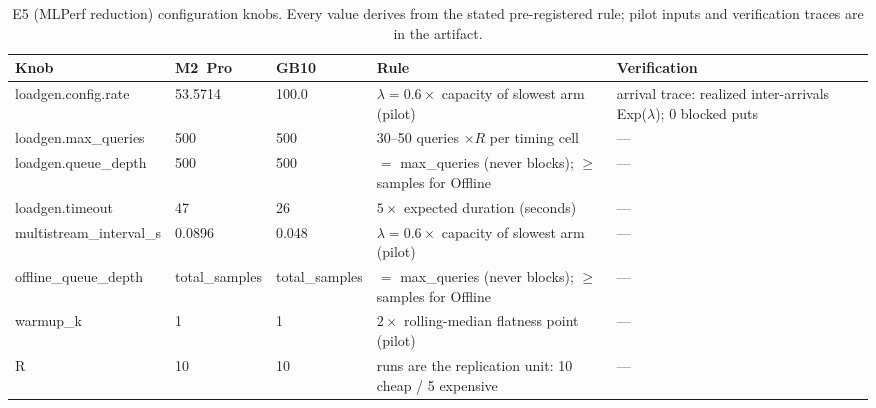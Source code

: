 \begin{table}[t]\centering\small
\caption{E5 (MLPerf reduction) configuration knobs. Every value derives from the stated pre-registered rule; pilot inputs and verification traces are in the artifact.}
\label{tab:knobs-e5}
\begin{tabular}{lllll}
\toprule
Knob & M2~Pro & GB10 & Rule & Verification \\
\midrule
loadgen.config.rate & 53.5714 & 100.0 & $\lambda = 0.6\times$ capacity of slowest arm (pilot) & arrival trace: realized inter-arrivals ~ Exp($\lambda$); 0 blocked puts \\
loadgen.max\_queries & 500 & 500 & 30--50 queries $\times R$ per timing cell & --- \\
loadgen.queue\_depth & 500 & 500 & $=$ max\_queries (never blocks); $\geq$ samples for Offline & --- \\
loadgen.timeout & 47 & 26 & $5\times$ expected duration (seconds) & --- \\
multistream\_interval\_s & 0.0896 & 0.048 & $\lambda = 0.6\times$ capacity of slowest arm (pilot) & --- \\
offline\_queue\_depth & total\_samples & total\_samples & $=$ max\_queries (never blocks); $\geq$ samples for Offline & --- \\
warmup\_k & 1 & 1 & $2\times$ rolling-median flatness point (pilot) & --- \\
R & 10 & 10 & runs are the replication unit: 10 cheap / 5 expensive & --- \\
\bottomrule
\end{tabular}
\end{table}

